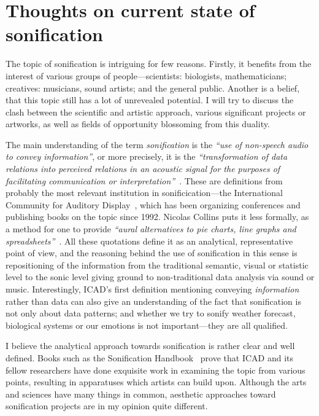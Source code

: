 \documentclass[12pt,a4paper,oneside]{report}
\begin{document}
\section{Thoughts on current state of sonification}

The topic of sonification is intriguing for few reasons. Firstly, it benefits from the interest of various groups of people---scientists: biologists, mathematicians; creatives: musicians, sound artists; and the general public. Another is a belief, that this topic still has a lot of unrevealed potential. I will try to discuss the clash between the scientific and artistic approach, various significant projects or artworks, as well as fields of opportunity blossoming from this duality.

The main understanding of the term \emph{sonification} is the \emph{``use of non-speech audio to convey information''}, or more precisely, it is the \emph{``transformation of data relations into perceived relations in an acoustic signal for the purposes of facilitating communication or interpretation''}~\cite[p.~1]{Fitch}. These are definitions from probably the most relevant institution in sonificication---the International Community for Auditory Display~\cite{icad}, which has been organizing conferences and publishing books on the topic since 1992. Nicolas Collins puts it less formally, as a method for one to provide \emph{``aural alternatives to pie charts, line graphs and spreadsheets''}~\cite[p.~7]{Collins2006}. All these quotations define it as an analytical, representative point of view, and the reasoning behind the use of sonification in this sense is repositioning of the information from the traditional semantic, visual or statistic level to the sonic level giving ground to non-traditional data analysis via sound or music. Interestingly, ICAD's first definition mentioning conveying \emph{information} rather than data can also give an understanding of the fact that sonification is not only about data patterns; and whether we try to sonify weather forecast, biological systems or our emotions is not important---they are all qualified.

I believe the analytical approach towards sonification is rather clear and well defined. Books such as the Sonification Handbook~\cite{Hermann2011} prove that ICAD and its fellow researchers have done exquisite work in examining the topic from various points, resulting in apparatuses which artists can build upon. Although the arts and sciences have many things in common, aesthetic approaches toward sonification projects are in my opinion quite different.
\end{document}
